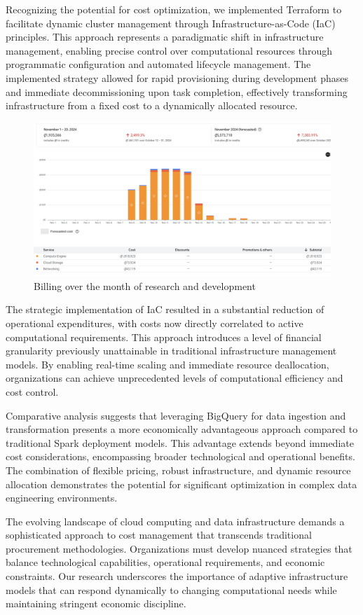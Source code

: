 Recognizing the potential for cost optimization, we implemented Terraform to facilitate dynamic
cluster management through Infrastructure-as-Code (IaC) principles. This approach represents a
paradigmatic shift in infrastructure management, enabling precise control over computational
resources through programmatic configuration and automated lifecycle management. The implemented
strategy allowed for rapid provisioning during development phases and immediate decommissioning upon
task completion, effectively transforming infrastructure from a fixed cost to a dynamically
allocated resource.

\begin{figure}
    \centering
    \includegraphics[width=0.8\linewidth]{images/billing.png}
    \caption{Billing over the month of research and development}
\end{figure}

The strategic implementation of IaC resulted in a substantial reduction of operational expenditures,
with costs now directly correlated to active computational requirements. This approach introduces a
level of financial granularity previously unattainable in traditional infrastructure management
models. By enabling real-time scaling and immediate resource deallocation, organizations can achieve
unprecedented levels of computational efficiency and cost control.

Comparative analysis suggests that leveraging BigQuery for data ingestion and transformation
presents a more economically advantageous approach compared to traditional Spark deployment models.
This advantage extends beyond immediate cost considerations, encompassing broader technological and
operational benefits. The combination of flexible pricing, robust infrastructure, and dynamic
resource allocation demonstrates the potential for significant optimization in complex data
engineering environments.

The evolving landscape of cloud computing and data infrastructure demands a sophisticated approach
to cost management that transcends traditional procurement methodologies. Organizations must develop
nuanced strategies that balance technological capabilities, operational requirements, and economic
constraints. Our research underscores the importance of adaptive infrastructure models that can
respond dynamically to changing computational needs while maintaining stringent economic discipline.

